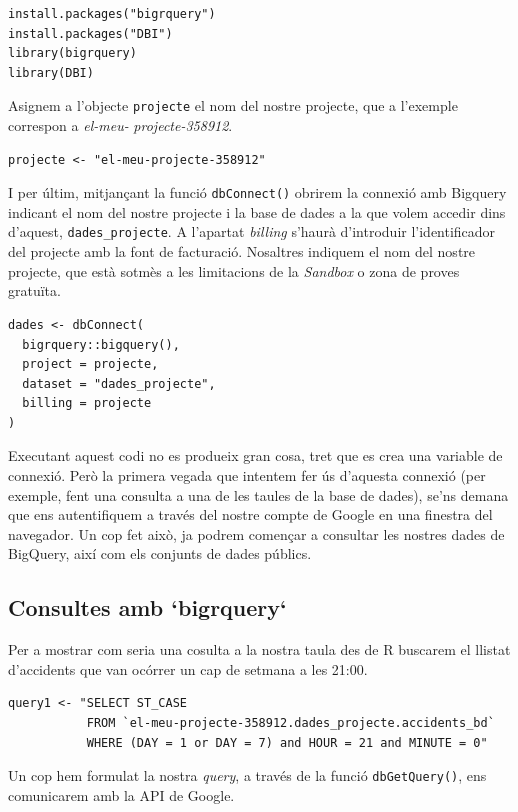 \documentclass[12pt,longbibliography]{article}
\theoremstyle{definition}
\theoremstyle{remark}
\begin{document}
\begin{verbatim}
install.packages("bigrquery")
install.packages("DBI")
library(bigrquery)
library(DBI)
\end{verbatim}

Asignem a l'objecte \texttt{projecte} el nom del nostre projecte, que a l'exemple correspon a \emph{el-meu-} \emph{projecte-358912}.

\begin{verbatim}
projecte <- "el-meu-projecte-358912"
\end{verbatim}

I per últim, mitjançant la funció \texttt{dbConnect()} obrirem la connexió amb Bigquery indicant el nom del nostre projecte i la base de dades a la que volem accedir dins d'aquest, \texttt{dades\_projecte}. A l'apartat \emph{billing} s'haurà d'introduir l'identificador del projecte amb la font de facturació. Nosaltres indiquem el nom del nostre projecte, que està sotmès a les limitacions de la \emph{Sandbox} o zona de proves gratuïta.

\begin{verbatim}
dades <- dbConnect(
  bigrquery::bigquery(),
  project = projecte,
  dataset = "dades_projecte",
  billing = projecte
)
\end{verbatim}

Executant aquest codi no es produeix gran cosa, tret que es crea una variable de connexió. Però la primera vegada que intentem fer ús d'aquesta connexió (per exemple, fent una consulta a una de les taules de la base de dades), se'ns demana que ens autentifiquem a través del nostre compte de Google en una finestra del navegador. Un cop fet això, ja podrem començar a consultar les nostres dades de BigQuery, així com els conjunts de dades públics. 


\subsection{Consultes amb `bigrquery`}

Per a mostrar com seria una cosulta a la nostra taula des de R buscarem el llistat d'accidents que van ocórrer un cap de setmana a les 21:00.

\begin{verbatim}
query1 <- "SELECT ST_CASE 
           FROM `el-meu-projecte-358912.dades_projecte.accidents_bd`
           WHERE (DAY = 1 or DAY = 7) and HOUR = 21 and MINUTE = 0"
\end{verbatim}

Un cop hem formulat la nostra \emph{query}, a través de la funció \texttt{dbGetQuery()}, ens comunicarem amb la API de Google. 
\end{document}
